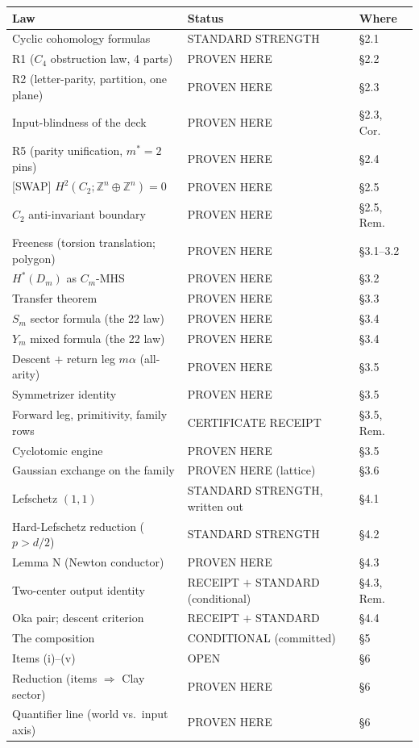 \documentclass[11pt]{article}
\newcommand{\Z}{\mathbb Z}
\begin{document}
\begin{center}
\begin{tabular}{lll}
Law & Status & Where\\
\hline
Cyclic cohomology formulas & STANDARD STRENGTH & \S2.1\\
R1 ($C_4$ obstruction law, 4 parts) & PROVEN HERE & \S2.2\\
R2 (letter-parity, partition, one plane) & PROVEN HERE & \S2.3\\
Input-blindness of the deck & PROVEN HERE & \S2.3, Cor.\\
R5 (parity unification, $m^*=2$ pins) & PROVEN HERE & \S2.4\\
{[SWAP]} $H^2(C_2;\Z^n\oplus\Z^n)=0$ & PROVEN HERE & \S2.5\\
$C_2$ anti-invariant boundary & PROVEN HERE & \S2.5, Rem.\\
Freeness (torsion translation; polygon) & PROVEN HERE & \S3.1--3.2\\
$H^*(D_m)$ as $C_m$-MHS & PROVEN HERE & \S3.2\\
Transfer theorem & PROVEN HERE & \S3.3\\
$S_m$ sector formula (the 22 law) & PROVEN HERE & \S3.4\\
$Y_m$ mixed formula (the 22 law) & PROVEN HERE & \S3.4\\
Descent $+$ return leg $m\alpha$ (all-arity) & PROVEN HERE & \S3.5\\
Symmetrizer identity & PROVEN HERE & \S3.5\\
Forward leg, primitivity, family rows & CERTIFICATE RECEIPT & \S3.5, Rem.\\
Cyclotomic engine & PROVEN HERE & \S3.5\\
Gaussian exchange on the family & PROVEN HERE (lattice) & \S3.6\\
Lefschetz $(1,1)$ & STANDARD STRENGTH, written out & \S4.1\\
Hard-Lefschetz reduction ($p>d/2$) & STANDARD STRENGTH & \S4.2\\
Lemma N (Newton conductor) & PROVEN HERE & \S4.3\\
Two-center output identity & RECEIPT $+$ STANDARD (conditional) & \S4.3, Rem.\\
Oka pair; descent criterion & RECEIPT $+$ STANDARD & \S4.4\\
The composition & CONDITIONAL (committed) & \S5\\
Items (i)--(v) & OPEN & \S6\\
Reduction (items $\Rightarrow$ Clay sector) & PROVEN HERE & \S6\\
Quantifier line (world vs.\ input axis) & PROVEN HERE & \S6\\
\end{tabular}
\end{center}
\end{document}
